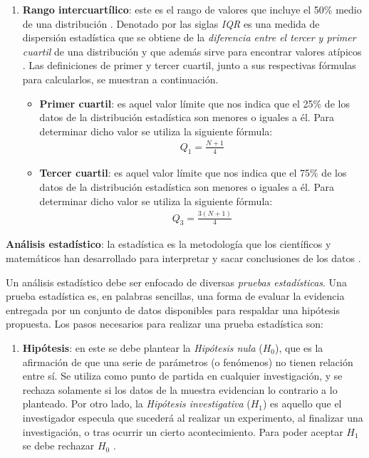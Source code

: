 \begin{enumerate}
\begin{itemize}
\begin{enumerate}
            \item \textbf{Rango intercuartílico}: este es el rango de valores que incluye el 50\% medio de una distribución \cite{Kipfer2021}. Denotado por las siglas \textit{IQR} es una medida de dispersión estadística que se obtiene de la \textit{diferencia entre el tercer y primer cuartil} de una distribución y que además sirve para encontrar valores atípicos \cite{10.1007/978-981-10-7563-6_53}. Las definiciones de primer y tercer cuartil, junto a sus respectivas fórmulas para calcularlos, se muestran a continuación.

            \begin{itemize}
                \item \textbf{Primer cuartil}: es aquel valor límite que nos indica que el 25\% de los datos de la distribución estadística son menores o iguales a él. Para determinar dicho valor se utiliza la siguiente fórmula:
                \begin{align*}
                    Q_1 = \frac{N+1}{4}
                \end{align*}

                \item \textbf{Tercer cuartil}: es aquel valor límite que nos indica que el 75\% de los datos de la distribución estadística son menores o iguales a él. Para determinar dicho valor se utiliza la siguiente fórmula:
                \begin{align*}
                    Q_3 = \frac{3(N+1)}{4}
                \end{align*}

            \end{itemize}

        \end{enumerate}


        \textbf{Análisis estadístico}: la estadística es la metodología que los científicos y matemáticos han desarrollado para interpretar y sacar conclusiones de los datos \cite{Anderson1996}.

        Un análisis estadístico debe ser enfocado de diversas \textit{pruebas estadísticas}. Una prueba estadística es, en palabras sencillas, una forma de evaluar la evidencia entregada por un conjunto de datos disponibles para respaldar una hipótesis propuesta. Los pasos necesarios para realizar una prueba estadística son:

        \begin{enumerate}
            \item \textbf{Hipótesis}: en este se debe plantear la \textit{Hipótesis nula} ($H_0$), que es la afirmación de que una serie de parámetros (o fenómenos) no tienen relación entre sí. Se utiliza como punto de partida en cualquier investigación, y se rechaza solamente si los datos de la muestra evidencian lo contrario a lo planteado. Por otro lado, la \textit{Hipótesis investigativa} ($H_1$) es aquello que el investigador especula que sucederá al realizar un experimento, al finalizar una investigación, o tras ocurrir un cierto acontecimiento. Para poder aceptar $H_1$ se debe rechazar $H_0$ \cite{metodologia_investigacion}.


\end{enumerate}
\end{itemize}
\end{enumerate}
